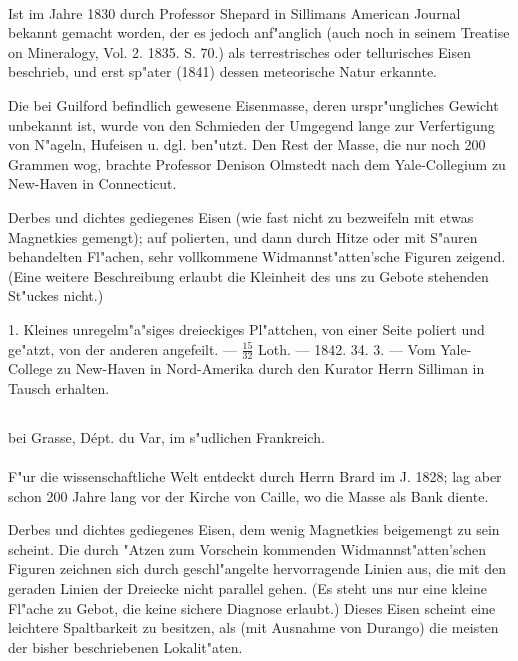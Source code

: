 \documentclass[a4paper, 11pt, oneside, polutonikogreek, german]{article}
\begin{document}
\paragraph{}
Ist im Jahre 1830 durch Professor Shepard in Sillimans American Journal bekannt gemacht worden, der es jedoch anf"anglich (auch noch in seinem Treatise on Mineralogy, Vol. 2. 1835. S. 70.) als terrestrisches oder tellurisches Eisen beschrieb, und erst sp"ater (1841) dessen meteorische Natur erkannte.

\setlength{\leftskip}{10mm}
\setlength{\parindent}{0pt}

{\footnotesize Die bei Guilford befindlich gewesene Eisenmasse, deren urspr"ungliches Gewicht unbekannt ist, wurde von den Schmieden der Umgegend lange zur Verfertigung von N"ageln, Hufeisen u. dgl. ben"utzt. Den Rest der Masse, die nur noch 200 Grammen wog, brachte Professor Denison Olmstedt nach dem Yale-Collegium zu New-Haven in Connecticut.}

\setlength{\leftskip}{0pt}
\setlength{\parindent}{20pt}

Derbes und dichtes gediegenes Eisen (wie fast nicht zu bezweifeln mit etwas Magnetkies gemengt); auf polierten, und dann durch Hitze oder mit S"auren behandelten Fl"achen, sehr vollkommene Widmannst"atten'sche Figuren zeigend. (Eine weitere Beschreibung erlaubt die Kleinheit des uns zu Gebote stehenden St"uckes nicht.)

1. Kleines unregelm"a"siges dreieckiges Pl"attchen, von einer Seite poliert und ge"atzt, von der anderen angefeilt. --- $\frac{15}{32}$ Loth. --- 1842. 34. 3. --- Vom Yale-College zu New-Haven in Nord-Amerika durch den Kurator Herrn Silliman in Tausch erhalten.
\subsection[\frakfamily{Caille.}]{}
\begin{center}

bei Grasse, Dépt. du Var, im s"udlichen Frankreich.
\end{center}
\paragraph{}
F"ur die wissenschaftliche Welt entdeckt durch Herrn Brard im J. 1828; lag aber schon 200 Jahre lang vor der Kirche von Caille, wo die Masse als Bank diente.

Derbes und dichtes gediegenes Eisen, dem wenig Magnetkies beigemengt zu sein scheint. Die durch "Atzen zum Vorschein kommenden Widmannst"atten'schen Figuren zeichnen sich durch geschl"angelte hervorragende Linien aus, die mit den geraden Linien der Dreiecke nicht parallel gehen. (Es steht uns nur eine kleine Fl"ache zu Gebot, die keine sichere Diagnose erlaubt.) Dieses Eisen scheint eine leichtere Spaltbarkeit zu besitzen, als (mit Ausnahme von Durango) die meisten der bisher beschriebenen Lokalit"aten.
\end{document}
